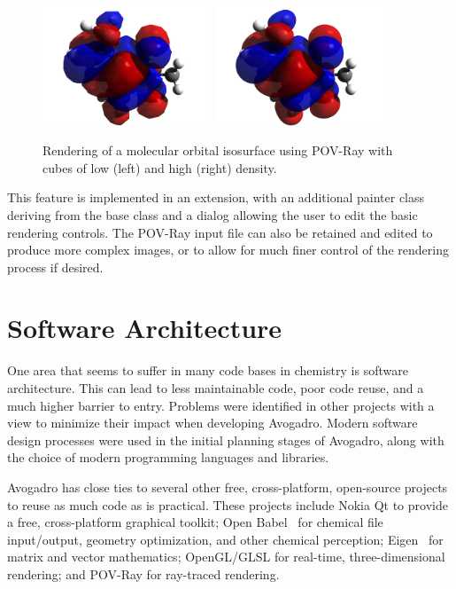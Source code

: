 \documentclass[10pt]{bmc_article}
\newenvironment{bmcformat}{\begin{raggedright}
\baselineskip20pt\sloppy\setboolean{publ}{false}}{\end{raggedright}
\baselineskip20pt\sloppy}
\begin{document}
\begin{bmcformat}
\begin{figure}
  \begin{center}
    \includegraphics[width=0.45\textwidth]{images/caffeine-homo3}
    \includegraphics[width=0.45\textwidth]{images/caffeine-homo4}
  \end{center}
  \caption{Rendering of a molecular orbital isosurface using POV-Ray with cubes
  of low (left) and high (right) density.}
 \label{f:electronic-ray}
\end{figure}

This feature is implemented in an extension, with an additional painter class
deriving from the base class and a dialog allowing the user to edit the basic
rendering controls. The POV-Ray input file can also be retained and edited to
produce more complex images, or to allow for much finer control of the
rendering process if desired.

\section{Software Architecture}

One area that seems to suffer in many code bases in chemistry is software
architecture. This can lead to less maintainable code, poor code reuse, and a
much higher barrier to entry. Problems were identified in other projects with a
view to minimize their impact when developing Avogadro. Modern software design
processes were used in the initial planning stages of Avogadro, along with the
choice of modern programming languages and libraries.


Avogadro has close ties to several other free, cross-platform, open-source
projects to reuse as much code as is practical. These projects include
Nokia Qt to provide a free, cross-platform graphical toolkit; Open
Babel~\cite{OpenBabel} for chemical file input/output, geometry optimization, and
other chemical perception; Eigen~\cite{Eigen} for matrix and vector mathematics;
OpenGL/GLSL for real-time, three-dimensional rendering; and POV-Ray for ray-traced
rendering.


\end{bmcformat}
\end{document}
